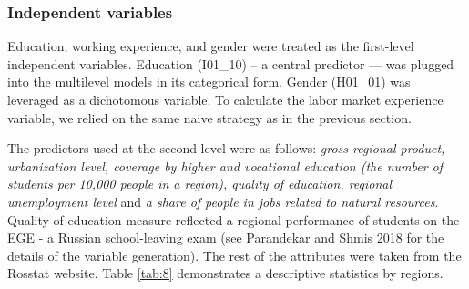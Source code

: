 \documentclass[12pt,a4paper]{article}
\numberwithin{equation}{section}
\begin{document}
\subsubsection{Independent variables}
Education, working experience, and gender were treated as the first-level independent variables. Education (I01\_10) -- a central predictor --- was plugged into the multilevel models in its categorical form. Gender (H01\_01) was leveraged as a dichotomous variable. To calculate the labor market experience variable, we relied on the same naive strategy as in the previous section.

The predictors used at the second level were as follows: \textit{gross regional product, urbanization level, coverage by higher and vocational education (the number of students per 10,000 people in a region), quality of education, regional unemployment level} and \textit{a share of people in jobs related to natural resources}. Quality of education measure reflected a regional performance of students on the EGE - a Russian school-leaving exam (see Parandekar and Shmis 2018 for the details of the variable generation). The rest of the attributes were taken from the Rosstat website. Table \ref{tab:8} demonstrates a descriptive statistics by regions.
\end{document}
